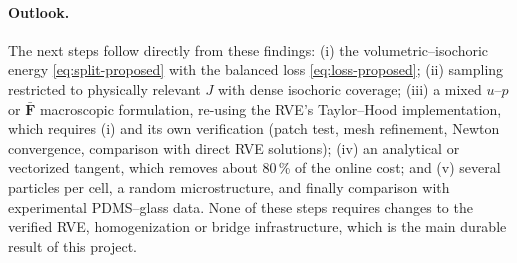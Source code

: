 \paragraph{Outlook.} The next steps follow directly from these findings:
(i) the volumetric--isochoric energy \cref{eq:split-proposed} with the balanced
loss \cref{eq:loss-proposed}; (ii) sampling restricted to
physically relevant $J$ with dense isochoric coverage; (iii) a mixed $u$--$p$ or
$\bar{\bm F}$ macroscopic formulation, re-using the RVE's Taylor--Hood
implementation, which requires (i) and its own verification (patch test, mesh
refinement, Newton convergence, comparison with direct RVE solutions); (iv) an analytical or vectorized tangent, which removes
about 80\,\% of the online cost; and (v) several particles per cell, a random
microstructure, and finally comparison with experimental PDMS--glass data. None
of these steps requires changes to the verified RVE, homogenization or bridge
infrastructure, which is the main durable result of this project.

